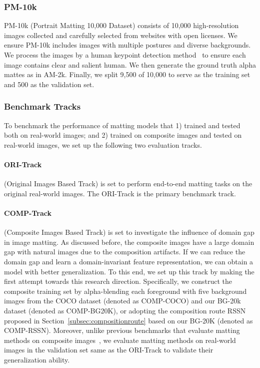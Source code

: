 \documentclass[twocolumn]{svjour3}
\begin{document}
\subsubsection{PM-10k} PM-10k (Portrait Matting 10,000 Dataset) consists of 10,000 high-resolution images collected and carefully selected from websites with open licenses. We ensure PM-10k includes images with multiple postures and diverse backgrounds. We process the images by a human keypoint detection method~\citep{zhang2021towards} to ensure each image contains clear and salient human. We then generate the ground truth alpha mattes as in AM-2k. Finally, we split 9,500 of 10,000 to serve as the training set and 500 as the validation set. 

\subsubsection{Benchmark Tracks}
To benchmark the performance of matting models that 1) trained and tested both on real-world images; and 2) trained on composite images and tested on real-world images, we set up the following two evaluation tracks.

\paragraph{ORI-Track} (Original Images Based Track) is set to perform end-to-end matting tasks on the original real-world images. The ORI-Track is the primary benchmark track.

\paragraph{COMP-Track} (Composite Images Based Track) is set to investigate the influence of domain gap in image matting. As discussed before, the composite images have a large domain gap with natural images due to the composition artifacts. If we can reduce the domain gap and learn a domain-invariant feature representation, we can obtain a model with better generalization. To this end, we set up this track by making the first attempt towards this research direction. Specifically, we construct the composite training set by alpha-blending each foreground with five background images from the COCO dataset \citep{lin2014microsoft} (denoted as COMP-COCO) and our BG-20k dataset (denoted as COMP-BG20K), or adopting the composition route RSSN proposed in Section~\ref{subsec:compositionroute} based on our BG-20K (denoted as COMP-RSSN). Moreover, unlike previous benchmarks that evaluate matting methods on composite images~\citep{xu2017deep,zhang2019late,Qiao_2020_CVPR}, we evaluate matting methods on real-world images in the validation set same as the ORI-Track to validate their generalization ability.
\end{document}
